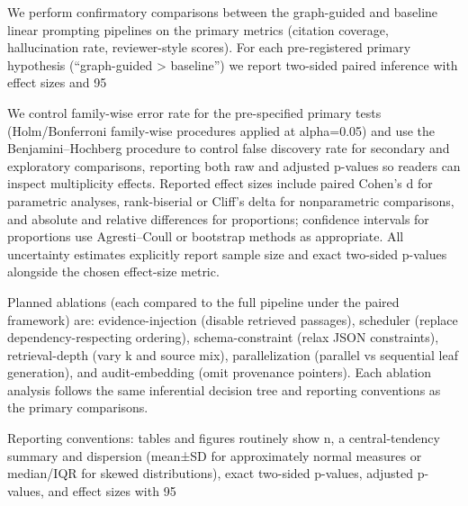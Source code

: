 We perform confirmatory comparisons between the graph-guided and baseline linear prompting pipelines on the primary metrics (citation coverage, hallucination rate, reviewer-style scores). For each pre-registered primary hypothesis (“graph-guided > baseline”) we report two-sided paired inference with effect sizes and 95%

We control family-wise error rate for the pre-specified primary tests (Holm/Bonferroni family-wise procedures applied at alpha=0.05) and use the Benjamini–Hochberg procedure to control false discovery rate for secondary and exploratory comparisons, reporting both raw and adjusted p-values so readers can inspect multiplicity effects. Reported effect sizes include paired Cohen's d for parametric analyses, rank-biserial or Cliff's delta for nonparametric comparisons, and absolute and relative differences for proportions; confidence intervals for proportions use Agresti–Coull or bootstrap methods as appropriate. All uncertainty estimates explicitly report sample size and exact two-sided p-values alongside the chosen effect-size metric.

Planned ablations (each compared to the full pipeline under the paired framework) are: evidence-injection (disable retrieved passages), scheduler (replace dependency-respecting ordering), schema-constraint (relax JSON constraints), retrieval-depth (vary k and source mix), parallelization (parallel vs sequential leaf generation), and audit-embedding (omit provenance pointers). Each ablation analysis follows the same inferential decision tree and reporting conventions as the primary comparisons.

Reporting conventions: tables and figures routinely show n, a central-tendency summary and dispersion (mean±SD for approximately normal measures or median/IQR for skewed distributions), exact two-sided p-values, adjusted p-values, and effect sizes with 95%